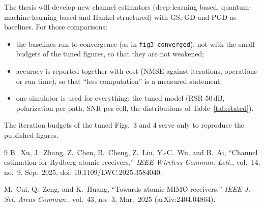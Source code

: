\documentclass[11pt,a4paper]{article}
\newcommand{\file}[1]{\texttt{#1}}
\begin{document}
The thesis will develop new channel estimators (deep-learning based, quantum-machine-learning
based and Hankel-structured) with GS, GD and PGD as baselines. For those comparisons:
\begin{itemize}[leftmargin=*,itemsep=1pt]
  \item the baselines run to convergence (as in \file{fig3\_converged}), not with the small
        budgets of the tuned figures, so that they are not weakened;
  \item accuracy is reported together with cost (NMSE against iterations, operations or run
        time), so that ``less computation'' is a measured statement;
  \item one simulator is used for everything: the tuned model (RSR 50\,dB, polarization per path,
        SNR per cell, the distributions of Table~\ref{tab:stated}).
\end{itemize}
The iteration budgets of the tuned Figs.~3 and 4 serve only to reproduce the published figures.

\begin{thebibliography}{9}
B.~Xu, J.~Zhang, Z.~Chen, B.~Cheng, Z.~Liu, Y.-C.~Wu, and B.~Ai,
``Channel estimation for Rydberg atomic receivers,''
\emph{IEEE Wireless Commun. Lett.}, vol.~14, no.~9, Sep.~2025, doi: 10.1109/LWC.2025.3584040.

M.~Cui, Q.~Zeng, and K.~Huang,
``Towards atomic MIMO receivers,''
\emph{IEEE J. Sel. Areas Commun.}, vol.~43, no.~3, Mar.~2025 (arXiv:2404.04864).
\end{thebibliography}
\end{document}
